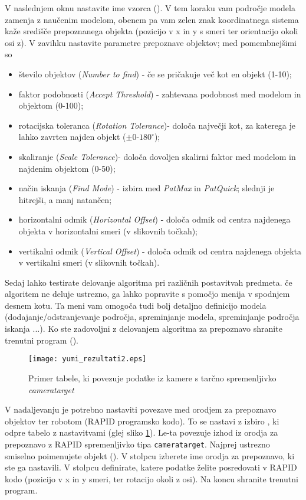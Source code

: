 V naslednjem oknu nastavite ime vzorca (). V tem koraku vam področje modela zamenja z naučenim modelom, obenem pa vam zelen znak koordinatnega sistema kaže središče prepoznanega objekta (pozicijo v x in y s smeri ter orientacijo okoli osi z). V zavihku  nastavite parametre prepoznave objektov; med pomembnejšimi so
\begin{itemize}
	\item število objektov (\emph{Number to find}) - če se pričakuje več kot en objekt (1-10);
	\item faktor podobnosti (\emph{Accept Threshold}) - zahtevana podobnost med modelom in objektom (0-100);
	\item rotacijska toleranca (\emph{Rotation Tolerance})- določa največji kot, za katerega je lahko zavrten najden objekt ($\pm 0$-$180^\circ$);
	\item skaliranje (\emph{Scale Tolerance})- določa dovoljen skalirni faktor med modelom in najdenim objektom (0-50);
	\item način iskanja (\emph{Find Mode}) - izbira med \emph{PatMax} in \emph{PatQuick}; slednji je hitrejši, a manj natančen;
	\item horizontalni odmik (\emph{Horizontal Offset}) - določa odmik od centra najdenega objekta v horizontalni smeri (v slikovnih točkah);
	\item vertikalni odmik (\emph{Vertical Offset}) - določa odmik od centra najdenega objekta v vertikalni smeri (v slikovnih točkah).
\end{itemize}


Sedaj lahko testirate delovanje algoritma pri različnih postavitvah predmeta. če algoritem ne deluje ustrezno, ga lahko popravite s pomočjo menija v spodnjem desnem kotu. Ta meni vam omogoča tudi bolj detaljno definicijo modela (dodajanje/odstranjevanje področja, spreminjanje modela, spreminjanje področja iskanja ...). Ko ste zadovoljni z delovanjem algoritma za prepoznavo shranite trenutni program ().

\begin{figure}[!hbt]
	\centering
	\texttt{[image: yumi\_rezultati2.eps]}
	\caption{Primer tabele, ki povezuje podatke iz kamere s tarčno spremenljivko \emph{cameratarget}}
	\label{fig:yumi_tabela}
\end{figure}

V nadaljevanju je potrebno nastaviti povezave med orodjem za prepoznavo objektov ter robotom (RAPID programsko kodo). To se nastavi z izbiro , ki odpre tabelo z nastavitvami (glej sliko \ref{fig:yumi_tabela}). Le-ta povezuje izhod iz orodja za prepoznavo z RAPID spremenljivko tipa \verb"cameratarget". Najprej ustrezno smiselno poimenujete objekt (). V stolpcu  izberete ime orodja za prepoznavo, ki ste ga nastavili. V stolpcu  definirate, katere podatke želite posredovati v RAPID kodo (pozicijo v x in y smeri, ter rotacijo okoli z osi). Na koncu shranite trenutni program.

